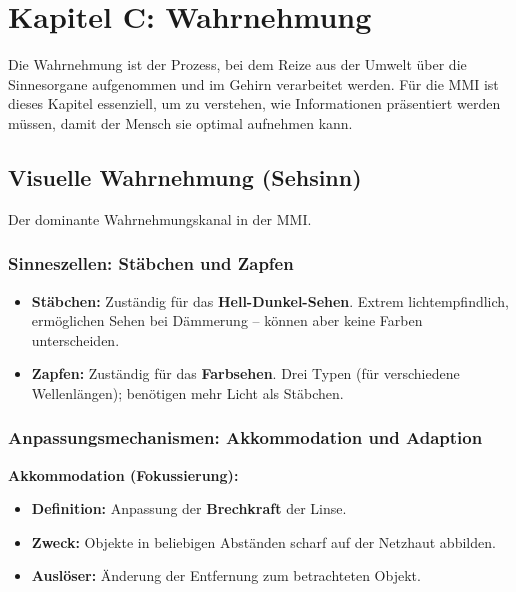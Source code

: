 \documentclass[12pt, a4paper]{article}
\begin{document}
\section{Kapitel C: Wahrnehmung}

Die Wahrnehmung ist der Prozess, bei dem Reize aus der Umwelt über die Sinnesorgane
aufgenommen und im Gehirn verarbeitet werden. Für die MMI ist dieses Kapitel essenziell,
um zu verstehen, wie Informationen präsentiert werden müssen, damit der Mensch sie
optimal aufnehmen kann.

\subsection{Visuelle Wahrnehmung (Sehsinn)}

Der dominante Wahrnehmungskanal in der MMI.

\subsubsection{Sinneszellen: Stäbchen und Zapfen}

\begin{itemize}
  \item \textbf{Stäbchen:} Zuständig für das \textbf{Hell-Dunkel-Sehen}. Extrem
        lichtempfindlich, ermöglichen Sehen bei Dämmerung -- können aber keine
        Farben unterscheiden.
  \item \textbf{Zapfen:} Zuständig für das \textbf{Farbsehen}. Drei Typen (für
        verschiedene Wellenlängen); benötigen mehr Licht als Stäbchen.
\end{itemize}

\subsubsection{Anpassungsmechanismen: Akkommodation und Adaption}

\textbf{Akkommodation (Fokussierung):}
\begin{itemize}
  \item \textbf{Definition:} Anpassung der \textbf{Brechkraft} der Linse.
  \item \textbf{Zweck:} Objekte in beliebigen Abständen scharf auf der Netzhaut
        abbilden.
  \item \textbf{Auslöser:} Änderung der Entfernung zum betrachteten Objekt.
\end{itemize}
\end{document}
